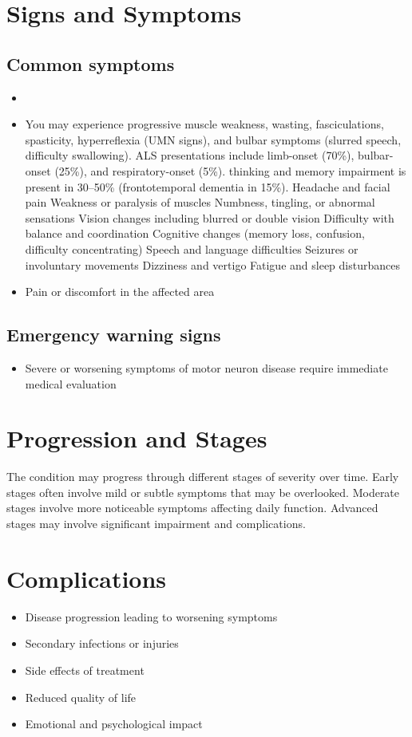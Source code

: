 \section{Signs and Symptoms}
\subsection{Common symptoms}
\begin{itemize}[noitemsep]
  \item \item You may experience progressive muscle weakness, wasting, fasciculations, spasticity, hyperreflexia (UMN signs), and bulbar symptoms (slurred speech, difficulty swallowing). ALS presentations include limb-onset (70\%), bulbar-onset (25\%), and respiratory-onset (5\%). thinking and memory impairment is present in 30--50\% (frontotemporal dementia in 15\%). Headache and facial pain Weakness or paralysis of muscles Numbness, tingling, or abnormal sensations Vision changes including blurred or double vision Difficulty with balance and coordination Cognitive changes (memory loss, confusion, difficulty concentrating) Speech and language difficulties Seizures or involuntary movements Dizziness and vertigo Fatigue and sleep disturbances
  \item Pain or discomfort in the affected area
  \end{itemize}
\subsection{Emergency warning signs}
\begin{itemize}[noitemsep]
  \item Severe or worsening symptoms of motor neuron disease require immediate medical evaluation
\end{itemize}
\section{Progression and Stages}
The condition may progress through different stages of severity over time. Early stages often involve mild or subtle symptoms that may be overlooked. Moderate stages involve more noticeable symptoms affecting daily function. Advanced stages may involve significant impairment and complications.
\section{Complications}
\begin{itemize}[noitemsep]
  \item Disease progression leading to worsening symptoms
  \item Secondary infections or injuries
  \item Side effects of treatment
  \item Reduced quality of life
  \item Emotional and psychological impact
\end{itemize}
